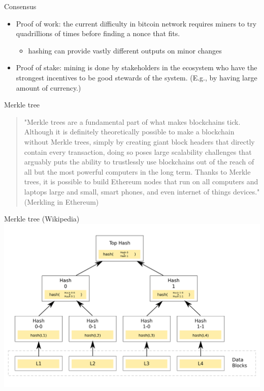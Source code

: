 \documentclass[presentation]{beamer}
\begin{document}
\begin{frame}[label=sec-2-7]{Consensus}
\begin{itemize}
\item \alert{Proof of work}: the current difficulty in bitcoin network requires miners to try quadrillions of times before finding a nonce that fits.
\begin{itemize}
\item \alert{hashing} can provide vastly different outputs on minor changes
\end{itemize}
\item \alert{Proof of stake}: mining is done by stakeholders in the ecosystem who have the strongest incentives to be good stewards of the system. (E.g., by having large amount of currency.)
\end{itemize}
\end{frame}
\begin{frame}[label=sec-2-8]{Merkle tree}
\begin{quotation}
"Merkle trees are a fundamental part of what makes blockchains tick. Although it
is definitely theoretically possible to make a blockchain without Merkle trees,
simply by creating giant block headers that directly contain every transaction,
doing so poses large scalability challenges that arguably puts the ability to
trustlessly use blockchains out of the reach of all but the most powerful
computers in the long term. Thanks to Merkle trees, it is possible to build
Ethereum nodes that run on all computers and laptops large and small, smart
phones, and even internet of things devices." (Merkling in Ethereum)
\end{quotation}
\end{frame}

\begin{frame}[label=sec-2-9]{Merkle tree (Wikipedia)}
\includegraphics[width=.9\linewidth]{../images/Hash_Tree.png}
\end{frame}
\end{document}
